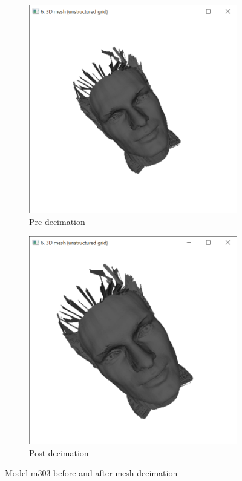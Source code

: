 \documentclass{bigdata}
\begin{document}
\begin{figure}[h!]
  \centering
  \begin{subfigure}[b]{0.4\linewidth}
    \includegraphics[width=\linewidth]{Pictures/preSub.png}
    \caption{Pre decimation}
  \end{subfigure}
  \begin{subfigure}[b]{0.4\linewidth}
    \includegraphics[width=\linewidth]{Pictures/postSub.png}
    \caption{Post decimation}
  \end{subfigure}
  \caption{Model m303 before and after mesh decimation}
  \label{fig:decimatedMesh}
\end{figure}
\end{document}
